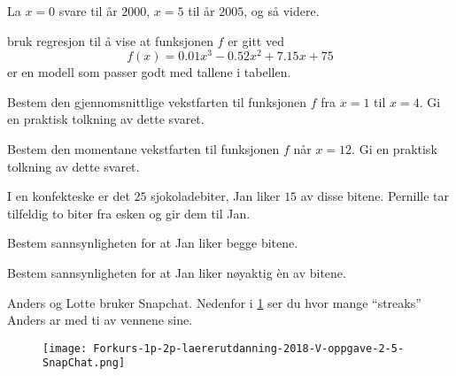 La $x=0$ svare til år $2000$, $x=5$ til år $2005$, og så videre.

\begin{oppgaver}
   bruk regresjon til å vise at funksjonen $f$ er gitt ved
  \begin{equation*}
    f(x) = \num{0.01} x^3 - \num{0.52}x^2 + \num{7.15}x + 75
  \end{equation*}
  er en modell som passer godt med tallene i tabellen.
\end{oppgaver}

\begin{oppgaver}
   Bestem den gjennomsnittlige vekstfarten til funksjonen $f$ fra
    $x = 1$ til $x = 4$.  Gi en praktisk tolkning av dette svaret.
\end{oppgaver}

\begin{oppgaver}
   Bestem den momentane vekstfarten til funksjonen $f$ når $x = 12$.
    Gi en praktisk tolkning av dette svaret.
\end{oppgaver}


\Oppgave[4]

I en konfekteske er det $25$ sjokoladebiter, Jan liker $15$ av disse bitene.
Pernille tar tilfeldig to biter fra esken og gir dem til Jan.

\begin{oppgaver}
   Bestem sannsynligheten for at Jan liker begge bitene.
\end{oppgaver}

\begin{oppgaver}
   Bestem sannsynligheten for at Jan liker nøyaktig èn av bitene.
\end{oppgaver}


\Oppgave[4]

Anders og Lotte bruker Snapchat. Nedenfor i
\cref{fig:Forkurs-1p-2p-laererutdanning-2018-V-oppgave-2-4} ser du hvor mange
\enquote{streaks} Anders ar med ti av vennene sine.

\begin{figure}[H]
  \centering
  \texttt{[image: Forkurs-1p-2p-laererutdanning-2018-V-oppgave-2-5-SnapChat.png]}
  \caption{}
  \label{fig:Forkurs-1p-2p-laererutdanning-2018-V-oppgave-2-4}
\end{figure}

